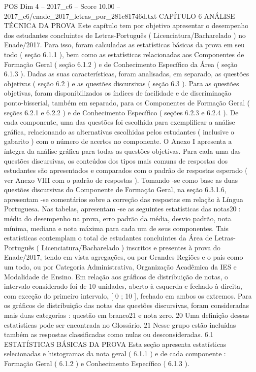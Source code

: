 \begin{textsample}{POS Dim 4 – 2017\_c6 – Score 10.00 – 2017\_c6/enade\_2017\_letras\_por\_281c81746d.txt}  \label{ex:f4_pos_036}
CAPÍTULO 6 ANÁLISE TÉCNICA DA PROVA Este capítulo tem por objetivo apresentar o desempenho dos estudantes concluintes de Letras-Português ( Licenciatura/Bacharelado ) no Enade/2017.
Para isso, foram calculadas as estatísticas básicas da prova em seu todo ( seção 6.1.1 ), bem como as estatísticas relacionadas aos Componentes de Formação Geral ( seção 6.1.2 ) e de Conhecimento Específico da Área ( seção 6.1.3 ).
Dadas as suas características, foram analisadas, em separado, as questões objetivas ( seção 6.2 ) e as questões discursivas ( seção 6.3 ).
Para as questões objetivas, foram disponibilizados os índices de facilidade e de discriminação ponto-bisserial, também em separado, para os Componentes de Formação Geral ( seções 6.2.1 e 6.2.2 ) e de Conhecimento Específico ( seções 6.2.3 e 6.2.4 ).
De cada componente, uma das questões foi escolhida para exemplificar a análise gráfica, relacionando as alternativas escolhidas pelos estudantes ( inclusive o gabarito ) com o número de acertos no componente.
O Anexo I apresenta a íntegra da análise gráfica para todas as questões objetivas.
Para cada uma das questões discursivas, os conteúdos dos tipos mais comuns de respostas dos estudantes são apresentados e comparados com o padrão de respostas esperado ( ver Anexo VIII com o padrão de respostas ).
Tomando -se como base as duas questões discursivas do Componente de Formação Geral, na seção 6.3.1.6, apresentam -se comentários sobre a correção das respostas em relação à Língua Portuguesa.
Nas tabelas, apresentam -se as seguintes estatísticas das notas20 : média do desempenho na prova, erro padrão da média, desvio padrão, nota mínima, mediana e nota máxima para cada um de seus componentes.
Tais estatísticas contemplam o total de estudantes concluintes da Área de Letras-Português ( Licenciatura/Bacharelado ) inscritos e presentes à prova do Enade/2017, tendo em vista agregações, ou por Grandes Regiões e o país como um todo, ou por Categoria Administrativa, Organização Acadêmica da IES e Modalidade de Ensino.
Em relação aos gráficos de distribuição de notas, o intervalo considerado foi de 10 unidades, aberto à esquerda e fechado à direita, com exceção do primeiro intervalo, [ 0 ; 10 ], fechado em ambos os extremos.
Para os gráficos de distribuição das notas das questões discursivas, foram consideradas mais duas categorias : questão em branco21 e nota zero. 20 Uma definição dessas estatísticas pode ser encontrada no Glossário. 21 Nesse grupo estão incluídas também as respostas classificadas como nulas ou desconsideradas. 6.1 ESTATÍSTICAS BÁSICAS DA PROVA Esta seção apresenta estatísticas selecionadas e histogramas da nota geral ( 6.1.1 ) e de cada componente : Formação Geral ( 6.1.2 ) e Conhecimento Específico ( 6.1.3 ).

\end{textsample}
